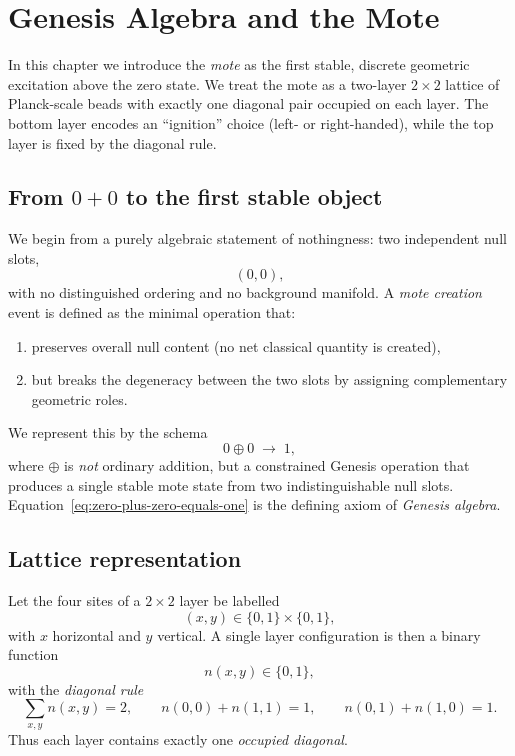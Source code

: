 

\chapter{Genesis Algebra and the Mote}

In this chapter we introduce the \emph{mote} as the first stable, discrete
geometric excitation above the zero state.  We treat the mote as a
two-layer $2\times 2$ lattice of Planck-scale beads with exactly one
diagonal pair occupied on each layer.  The bottom layer encodes an
``ignition'' choice (left- or right-handed), while the top layer is fixed
by the diagonal rule.

\section{From $0+0$ to the first stable object}

We begin from a purely algebraic statement of nothingness: two
independent null slots,
\[
  (0,0),
\]
with no distinguished ordering and no background manifold.  A \emph{mote
creation} event is defined as the minimal operation that:

\begin{enumerate}
  \item preserves overall null content (no net classical quantity is
  created),
  \item but breaks the degeneracy between the two slots by assigning
  complementary geometric roles.
\end{enumerate}

We represent this by the schema
\begin{equation}
  0 \oplus 0 \;\longrightarrow\; 1,
  \label{eq:zero-plus-zero-equals-one}
\end{equation}
where $\oplus$ is \emph{not} ordinary addition, but a constrained
Genesis operation that produces a single stable mote state from two
indistinguishable null slots.  Equation~\eqref{eq:zero-plus-zero-equals-one}
is the defining axiom of \emph{Genesis algebra}.

\section{Lattice representation}

Let the four sites of a $2\times 2$ layer be labelled
\[
  (x,y) \in \{0,1\}\times\{0,1\},
\]
with $x$ horizontal and $y$ vertical.  A single layer configuration is
then a binary function
\[
  n(x,y) \in \{0,1\},
\]
with the \emph{diagonal rule}
\begin{equation}
  \sum_{x,y} n(x,y) = 2,
  \qquad
  n(0,0) + n(1,1) = 1,
  \qquad
  n(0,1) + n(1,0) = 1.
  \label{eq:diagonal-rule}
\end{equation}
Thus each layer contains exactly one \emph{occupied diagonal}.


